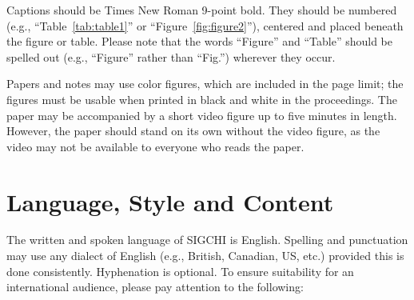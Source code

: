\documentclass{sigchi}
\begin{document}
Captions should be Times New Roman 9-point bold.  They should be numbered (e.g.,
``Table~\ref{tab:table1}'' or ``Figure~\ref{fig:figure2}''), centered
and placed beneath the figure or table.  Please note that the words
``Figure'' and ``Table'' should be spelled out (e.g., ``Figure''
rather than ``Fig.'') wherever they occur.

Papers and notes may use color figures, which are included in the page
limit; the figures must be usable when printed in black and white in
the proceedings.  The paper may be accompanied by a short video figure
up to five minutes in length.  However, the paper should stand on its
own without the video figure, as the video may not be available to
everyone who reads the paper.

\section{Language, Style and Content}

The written and spoken language of SIGCHI is English. Spelling and
punctuation may use any dialect of English (e.g., British, Canadian,
US, etc.) provided this is done consistently. Hyphenation is
optional. To ensure suitability for an international audience, please
pay attention to the following:
\end{document}
